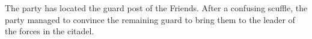 The party has located the guard post of the Friends.
After a confusing scuffle, the party managed to convince the remaining guard to bring them to the leader of the forces in the citadel.
